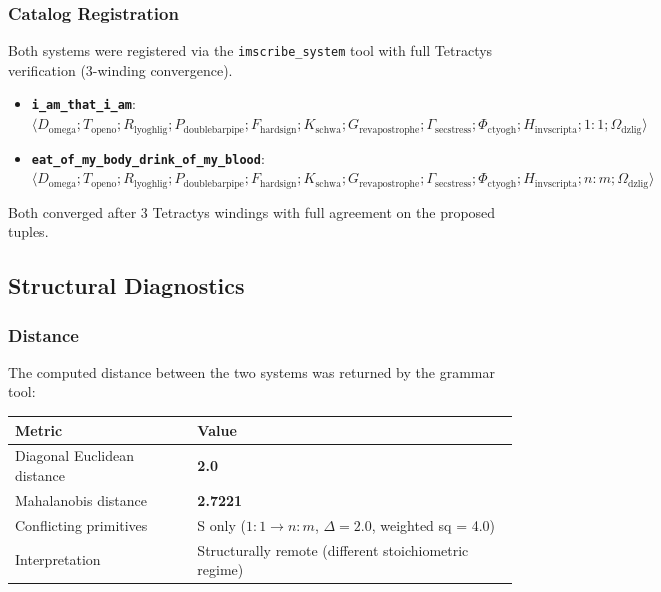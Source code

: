 \documentclass[12pt,a4paper]{article}
\begin{document}
\subsubsection{Catalog Registration}

Both systems were registered via the \texttt{imscribe\_system} tool with full Tetractys verification (3-winding convergence).

\begin{itemize}
    \item \textbf{\texttt{i\_am\_that\_i\_am}}: $\langle D_{\text{omega}}; T_{\text{openo}}; R_{\text{lyoghlig}}; P_{\text{doublebarpipe}}; F_{\text{hardsign}}; K_{\text{schwa}}; G_{\text{revapostrophe}}; \Gamma_{\text{secstress}}; \Phi_{\text{ctyogh}}; H_{\text{invscripta}}; 1{:}1; \Omega_{\text{dzlig}} \rangle$
    \item \textbf{\texttt{eat\_of\_my\_body\_drink\_of\_my\_blood}}: $\langle D_{\text{omega}}; T_{\text{openo}}; R_{\text{lyoghlig}}; P_{\text{doublebarpipe}}; F_{\text{hardsign}}; K_{\text{schwa}}; G_{\text{revapostrophe}}; \Gamma_{\text{secstress}}; \Phi_{\text{ctyogh}}; H_{\text{invscripta}}; n{:}m; \Omega_{\text{dzlig}} \rangle$
\end{itemize}

Both converged after 3 Tetractys windings with full agreement on the proposed tuples.

\subsection{Structural Diagnostics}

\subsubsection{Distance}

The computed distance between the two systems was returned by the grammar tool:

\begin{table}[htbp]
\centering
\small
{}
\begin{tabularx}{\textwidth}{>{\centering\arraybackslash}X >{\centering\arraybackslash}X}
\toprule
\rowcolor{gray!25}\textbf{Metric} & \textbf{Value} \\
\midrule
\rowcolors{1}{white}{gray!10}
Diagonal Euclidean distance & \textbf{2.0} \\
Mahalanobis distance & \textbf{2.7221} \\
Conflicting primitives & S only ($1{:}1 \to n{:}m$, $\Delta = 2.0$, weighted sq = 4.0) \\
Interpretation & Structurally remote (different stoichiometric regime) \\
\bottomrule
\end{tabularx}
\end{table}
\end{document}
